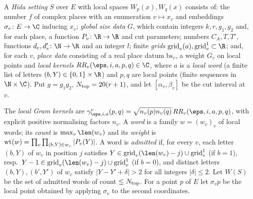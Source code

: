 \begin{definition}\label{pf:thmS-carrier:hida}
A \emph{Hida setting} $S$ over $E$ with local spaces $W_p(x),W_q(x)$ consists of: the number $f$ of complex places with an
enumeration $v\mapsto x_v$ and embeddings $\sigma_v\colon E\to\C$ inducing $x_v$; \emph{global size data} $G$, which
contain integers $k,r,g_1,g_2$ and, for each place, a function $P_v\colon\R\to\R$ and cut parameters; numbers $C_A,T,T'$,
functions $d_e,d_e'\colon\N\to\R$ and an integer $l$; finite \emph{grids} $\mathrm{grid}_v(a),\mathrm{grid}^1_v\subset\R$;
and, for each $v$, \emph{place data} consisting of a real place datum $\mathrm{bs}_v$, a weight $G_v$ on local points and
\emph{local kernels} $RR_v(\eps,i,a,p,q)\in\C$, where $a$ is a \emph{local word} (a finite list of letters
$(b,Y)\in\{0,1\}\times\R$) and $p,q$ are local points (finite sequences in $\N\times\C$). Put $g=g_1g_2$,
$N_{\mathrm{top}}=20(r+1)$, and let $[\alpha_v,\beta_v]$ be the cut interval at $v$.

The \emph{local Gram kernels} are $\gamma^{v}_{\eps,i,a}(p,q)=\sqrt{n_v(p)n_v(q)}\,RR_v(\eps,i,a,p,q)$, with explicit
positive normalising factors $n_v$. A \emph{word} is a family $w=(w_v)_v$ of local words; its \emph{count} is
$\max_v\len(w_v)$ and its \emph{weight} is $\operatorname{wt}(w)=\prod_v\prod_{(b,Y)\in w_v}|P_v(Y)|$. A word is
\emph{admitted} if, for every $v$, each letter $(b,Y)$ of $w_v$ in position $j$ satisfies
$Y\in\mathrm{grid}_v(\len(w_v)-j)\cup\mathrm{grid}_v^1$ (if $b=1$), resp.\
$Y-1\in\mathrm{grid}_v(\len(w_v)-j)\cup\mathrm{grid}_v^1$ (if $b=0$), and distinct letters $(b,Y),(b',Y')$ of $w_v$
satisfy $|Y-Y'+\delta|>2$ for all integers $|\delta|\le2$. Let $W(S)$ be the set of admitted words of count
$\le N_{\mathrm{top}}$. For a point $p$ of $E$ let $\sigma_vp$ be the local point obtained by applying $\sigma_v$ to the
second coordinates.
\end{definition}

